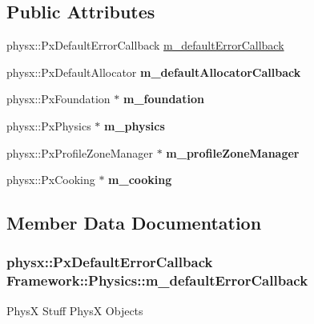 \subsection*{Public Attributes}
\begin{DoxyCompactItemize}
\item 
physx::PxDefaultErrorCallback \hyperlink{classFramework_1_1Physics_af442eecae1b872088a79f3f0718ebb1d}{m\_\-defaultErrorCallback}
\item 
\hypertarget{classFramework_1_1Physics_a1419dee505b44f8b461899ae1b43ba2f}{
physx::PxDefaultAllocator {\bfseries m\_\-defaultAllocatorCallback}}
\label{classFramework_1_1Physics_a1419dee505b44f8b461899ae1b43ba2f}

\item 
\hypertarget{classFramework_1_1Physics_ae96ca1558b78e3fe5918a78ae32752db}{
physx::PxFoundation $\ast$ {\bfseries m\_\-foundation}}
\label{classFramework_1_1Physics_ae96ca1558b78e3fe5918a78ae32752db}

\item 
\hypertarget{classFramework_1_1Physics_a6546bfa6530eefc4035b884d3b58d26b}{
physx::PxPhysics $\ast$ {\bfseries m\_\-physics}}
\label{classFramework_1_1Physics_a6546bfa6530eefc4035b884d3b58d26b}

\item 
\hypertarget{classFramework_1_1Physics_aabbb929cb7dcac2b1a13af27523f30b1}{
physx::PxProfileZoneManager $\ast$ {\bfseries m\_\-profileZoneManager}}
\label{classFramework_1_1Physics_aabbb929cb7dcac2b1a13af27523f30b1}

\item 
\hypertarget{classFramework_1_1Physics_a9ad16dd734143d6d522c9289e64d383d}{
physx::PxCooking $\ast$ {\bfseries m\_\-cooking}}
\label{classFramework_1_1Physics_a9ad16dd734143d6d522c9289e64d383d}

\end{DoxyCompactItemize}


\subsection{Member Data Documentation}
\hypertarget{classFramework_1_1Physics_af442eecae1b872088a79f3f0718ebb1d}{
\subsubsection[{m\_\-defaultErrorCallback}]{\setlength{\rightskip}{0pt plus 5cm}physx::PxDefaultErrorCallback {\bf Framework::Physics::m\_\-defaultErrorCallback}}}
\label{classFramework_1_1Physics_af442eecae1b872088a79f3f0718ebb1d}
PhysX Stuff PhysX Objects 

